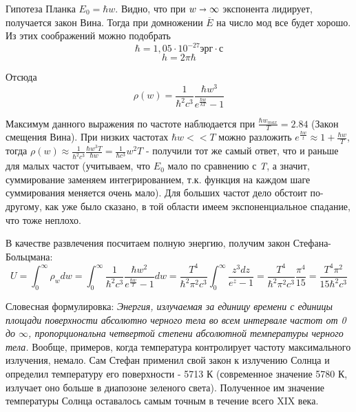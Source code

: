 \par Гипотеза Планка $E_0 = \hbar w$. Видно, что при $ w \shortrightarrow \infty$ экспонента лидирует, получается закон Вина. Тогда при домножении $\overline E$ на число мод все будет хорошо. Из этих соображений можно подобрать $$ \hbar = 1,05 \cdot 10^{-27}эрг \cdot с $$
$$ h= 2 \pi \hbar $$
\par Отсюда $$ \rho (w) = \frac{1}{ \hbar ^2 c^3} \frac{\hbar w^3}{e^{\frac{\hbar w}{kT}}-1} $$ 
\par Максимум данного выражения по частоте наблюдается при $\frac{\hbar w_{max}}{T}=2.84$ (Закон смещения Вина). При низких частотах $ \hbar w < < T$ можно разложить $e^{\frac{\hbar w}{t}} \approx  1 + \frac{\hbar w}{T} $, тогда $ \rho (w) \approx \frac{1}{ \hbar ^2 c^3} \frac{\hbar w^3 T}{\hbar w} = \frac{1}{ \hbar c^3}  w^2 T $ - получили тот же самый ответ, что и раньше для малых частот (учитываем, что $E_0$ мало по сравнению с \textit{T}, а значит, суммирование заменяем интегрированием, т.к. функция на каждом шаге суммирования меняется очень мало). Для больших частот дело обстоит по-другому, как уже было сказано, в той области имеем экспоненциальное спадание, что тоже неплохо. 
\par В качестве развлечения посчитаем полную энергию, получим закон Стефана-Больцмана:
$$ U = \int_{0}^{\infty} \rho _w dw = \int_{0}^{\infty} \frac{1}{\hbar ^2 c^3} \frac{\hbar w^2}{e^{\frac{\hbar w}{T}}-1} dw = \frac{T^4}{\hbar ^2 \pi ^2 c^3} \int_{0}^{\infty} \frac{z^3 dz}{e^z -1} =\frac{T^4}{\hbar ^2 \pi ^2 c^3} \frac{\pi ^4}{15} = \frac{T^4 \pi ^2}{15 \hbar ^2 c^3}$$
\par Словесная формулировка: \textit{Энергия, излучаемая за единицу времени с единицы площади поверхности абсолютно черного тела во всем интервале частот от 0 до $\infty$, пропорциональна четвертой степени абсолютной температуры черного тела.} Вообще, примеров, когда температура контролирует частоту максимального излучения, немало. Сам Стефан применил свой закон к
излучению Солнца и определил температуру его поверхности - 5713 К (современное значение 5780 К, излучает оно больше в диапозоне зеленого света). Полученное им значение температуры Солнца оставалось самым точным в течение всего XIX века. 